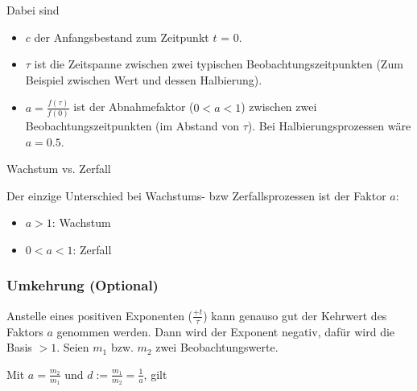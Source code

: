
Dabei sind
\begin{itemize}
\item $c$ der Anfangsbestand zum Zeitpunkt $t$ = 0.
\item $\tau$ ist die Zeitspanne zwischen zwei typischen Beobachtungszeitpunkten (Zum Beispiel zwischen Wert und dessen Halbierung).
\item $a=\frac{f(\tau)}{f(0)}$ ist der Abnahmefaktor ($0<a<1$) zwischen zwei Beobachtungszeitpunkten (im Abstand von $\tau$). Bei Halbierungsprozessen \zB wäre $a=0.5$.
\end{itemize}

\begin{bemerkung}{Wachstum vs. Zerfall}{}

  Der einzige Unterschied bei Wachstums- bzw Zerfallsprozessen ist der
  Faktor $a$:

  \begin{itemize}
  \item $a>1$: Wachstum
  \item $0<a<1$: Zerfall
    \end{itemize}
  
  \end{bemerkung}
\newpage

\subsubsection{Umkehrung (Optional)}
Anstelle eines  positiven Exponenten ($\frac{+t}{\tau}$) kann genauso
gut der Kehrwert des Faktors $a$ genommen werden. Dann wird der
Exponent negativ, dafür wird die Basis $> 1$. Seien $m_1$ bzw. $m_2$
zwei Beobachtungswerte.

Mit $a = \frac{m_2}{m_1}$ und $d := \frac{m_1}{m_2} = \frac{1}{a}$, gilt

\begin{center}
\end{center}


\newpage


